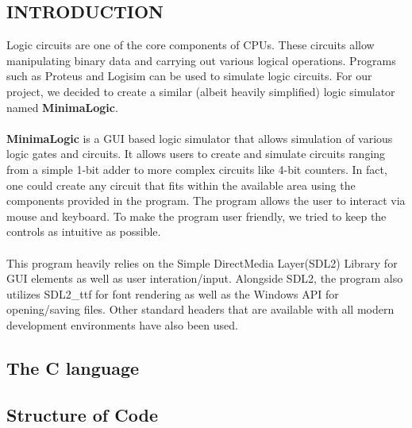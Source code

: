 \documentclass[report.tex]{subfiles}
\begin{document}
\newpage
\begin{large}
\section{INTRODUCTION}
    Logic circuits are one of the core components of CPUs. These circuits allow manipulating binary data and carrying out various logical operations.
    Programs such as Proteus and Logisim can be used to simulate logic circuits.
    For our project, we decided to create a similar (albeit heavily simplified) logic simulator named \textbf{MinimaLogic}.
    \\\\
    \textbf{MinimaLogic} is a GUI based logic simulator that allows simulation of various logic gates and circuits.
    It allows users to create and simulate circuits ranging from a simple 1-bit adder to more complex circuits like 4-bit counters.
    In fact, one could create any circuit that fits within the available area using the components provided in the program.
    The program allows the user to interact via mouse and keyboard. To make the program user friendly, we tried to keep the controls as intuitive as possible.
    \\\\
    This program heavily relies on the Simple DirectMedia Layer(SDL2) Library for GUI elements as well as user interation/input. 
    Alongside SDL2, the program also utilizes SDL2\_ttf for font rendering as well as the Windows API for opening/saving files.
    Other standard headers that are available with all modern development environments have also been used.
    \subsection{The C language}
    \subsection{Structure of Code}

\end{large}
\end{document}
